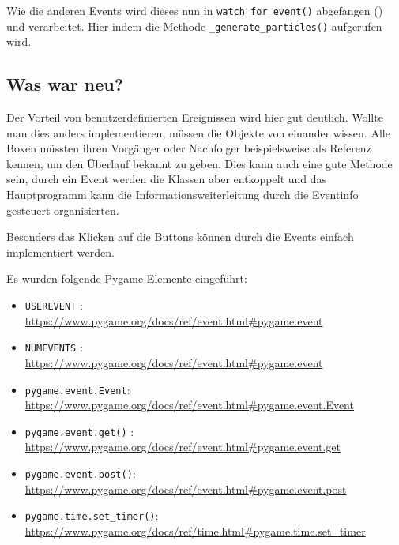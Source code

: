 Wie die anderen Events wird dieses nun in \texttt{watch\_for\_event()} abgefangen () und verarbeitet. Hier indem die Methode \texttt{\_generate\_particles()} aufgerufen wird.


\subsection*{Was war neu?}

Der Vorteil von benutzerdefinierten Ereignissen wird hier gut deutlich. Wollte man dies anders implementieren, müssen die Objekte von einander wissen. Alle Boxen müssten ihren Vorgänger oder Nachfolger beispielsweise als Referenz kennen, um den Überlauf bekannt zu geben. Dies kann auch eine gute Methode sein, durch ein Event werden die Klassen aber entkoppelt und das Hauptprogramm kann die Informationsweiterleitung durch die Eventinfo gesteuert organisierten.

Besonders das Klicken auf die Buttons können durch die Events einfach implementiert werden.


Es wurden folgende Pygame-Elemente eingeführt:

\begin{itemize}
	\item \texttt{USEREVENT}
    :\\
    \url{https://www.pygame.org/docs/ref/event.html#pygame.event}

    \item \texttt{NUMEVENTS}
    :\\
    \url{https://www.pygame.org/docs/ref/event.html#pygame.event}

	\item \texttt{pygame.event.Event}:
	\\
	\url{https://www.pygame.org/docs/ref/event.html#pygame.event.Event}
	
	\item \texttt{pygame.event.get()}
    :\\
    \url{https://www.pygame.org/docs/ref/event.html#pygame.event.get}

	\item \texttt{pygame.event.post()}:
	\\
	\url{https://www.pygame.org/docs/ref/event.html#pygame.event.post}
	
	\item \texttt{pygame.time.set\_timer()}:
	\\
	\url{https://www.pygame.org/docs/ref/time.html#pygame.time.set_timer}

	
\end{itemize}


